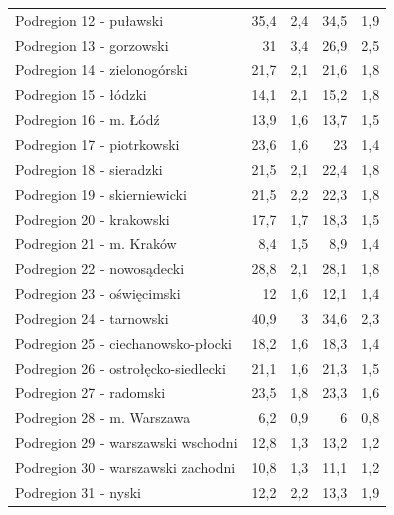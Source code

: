 \begin{center}
\begin{longtable}{p{6cm}rrrr}
Podregion 12 - puławski                  & 35,4    & 2,4         & 34,5     & 1,9          \\
Podregion 13 - gorzowski                 & 31      & 3,4         & 26,9     & 2,5          \\
Podregion 14 - zielonogórski             & 21,7    & 2,1         & 21,6     & 1,8          \\
Podregion 15 - łódzki                    & 14,1    & 2,1         & 15,2     & 1,8          \\
Podregion 16 - m. Łódź                   & 13,9    & 1,6         & 13,7     & 1,5          \\
Podregion 17 - piotrkowski               & 23,6    & 1,6         & 23       & 1,4          \\
Podregion 18 - sieradzki                 & 21,5    & 2,1         & 22,4     & 1,8          \\
Podregion 19 - skierniewicki             & 21,5    & 2,2         & 22,3     & 1,8          \\
Podregion 20 - krakowski                 & 17,7    & 1,7         & 18,3     & 1,5          \\
Podregion 21 - m. Kraków                 & 8,4     & 1,5         & 8,9      & 1,4          \\
Podregion 22 - nowosądecki               & 28,8    & 2,1         & 28,1     & 1,8          \\
Podregion 23 - oświęcimski               & 12      & 1,6         & 12,1     & 1,4          \\
Podregion 24 - tarnowski                 & 40,9    & 3           & 34,6     & 2,3          \\
Podregion 25 - ciechanowsko-płocki       & 18,2    & 1,6         & 18,3     & 1,4          \\
Podregion 26 - ostrołęcko-siedlecki      & 21,1    & 1,6         & 21,3     & 1,5          \\
Podregion 27 - radomski                  & 23,5    & 1,8         & 23,3     & 1,6          \\
Podregion 28 - m. Warszawa               & 6,2     & 0,9         & 6        & 0,8          \\
Podregion 29 - warszawski wschodni       & 12,8    & 1,3         & 13,2     & 1,2          \\
Podregion 30 - warszawski zachodni       & 10,8    & 1,3         & 11,1     & 1,2          \\
Podregion 31 - nyski                     & 12,2    & 2,2         & 13,3     & 1,9          \\

\end{longtable}
\end{center}
